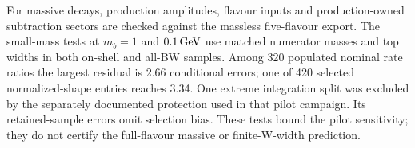 For massive decays, production amplitudes, flavour inputs and
production-owned subtraction sectors are checked against the massless
five-flavour export. The small-mass tests at $m_b=1$ and $0.1\,\mathrm{GeV}$ use
matched numerator masses and top widths in both on-shell and all-BW
samples. Among 320 populated nominal rate ratios the largest residual
is 2.66 conditional errors; one of 420 selected normalized-shape entries
reaches 3.34. One extreme integration split was excluded by the separately
documented protection used in that pilot campaign. Its retained-sample
errors omit selection bias. These tests bound the pilot sensitivity;
they do not certify the full-flavour massive or finite-W-width prediction.
